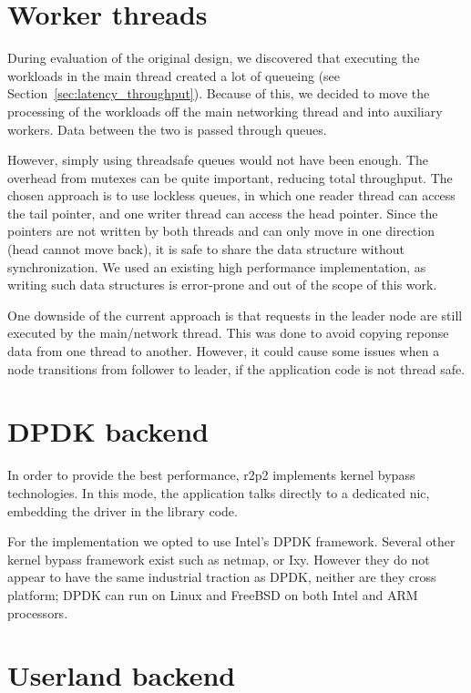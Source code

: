 \section{Worker threads}

During evaluation of the original design, we discovered that executing the workloads in the main thread created a lot of queueing (see Section~\ref{sec:latency_throughput}).
Because of this, we decided to move the processing of the workloads off the main networking thread and into auxiliary workers.
Data between the two is passed through queues.

However, simply using threadsafe queues would not have been enough.
The overhead from mutexes can be quite important, reducing total throughput.
The chosen approach is to use lockless queues, in which one reader thread can access the tail pointer, and one writer thread can access the head pointer.
Since the pointers are not written by both threads and can only move in one direction (head cannot move back), it is safe to share the data structure without synchronization.
We used an existing high performance implementation\cite{fast_queue}, as writing such data structures is error-prone and out of the scope of this work.

One downside of the current approach is that requests in the leader node are still executed by the main/network thread.
This was done to avoid copying reponse data from one thread to another.
However, it could cause some issues when a node transitions from follower to leader, if the application code is not thread safe.

\section{DPDK backend}

In order to provide the best performance, \gls{r2p2} implements kernel bypass technologies.
In this mode, the application talks directly to a dedicated \gls{nic}, embedding the driver in the library code.

For the implementation we opted to use Intel's DPDK framework.
Several other kernel bypass framework exist such as netmap\cite{netmap}, or Ixy\cite{ixy}.
However they do not appear to have the same industrial traction as DPDK, neither are they cross platform; DPDK can run on Linux and FreeBSD on both Intel and ARM processors.

\section{Userland backend}

